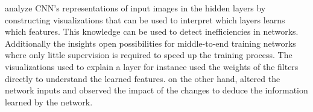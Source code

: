 \textcite{2018-zhang-visual} analyze CNN's representations of input images in the hidden layers by constructing 
visualizations that can be used to interpret which layers learns which features. This knowledge can be used to
detect inefficiencies in networks. Additionally the insights open possibilities for middle-to-end training
networks where only little supervision is required to speed up the training process.
The visualizations used to explain a layer for instance used the weights of the filters directly to understand
the learned features. \textcite{2018-montavon-methods} on the other hand, altered the network inputs and observed 
the impact of the changes to deduce the information learned by the network.\\





